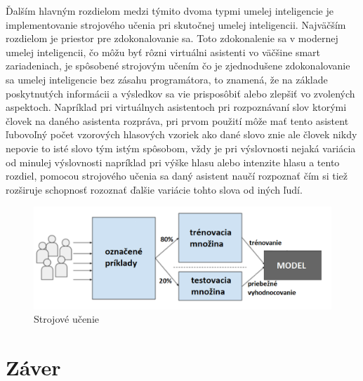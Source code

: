 \documentclass[10pt,oneside,slovak,a4paper]{article}
\begin{document}
Ďalším hlavným rozdielom medzi týmito dvoma typmi umelej inteligencie je implementovanie strojového učenia pri skutočnej umelej inteligencii. Najväčším rozdielom je priestor pre zdokonalovanie sa. Toto zdokonalenie sa v modernej umelej inteligencii, čo môžu byť rôzni virtuálni asistenti vo väčšine smart zariadeniach, je spôsobené strojovým učením čo je zjednodušene zdokonalovanie sa umelej inteligencie bez zásahu programátora, to znamená, že na základe poskytnutých informácii a výsledkov sa vie prisposôbiť alebo zlepšiť vo zvolených aspektoch. Napríklad pri virtuálnych asistentoch pri rozpoznávaní slov ktorými človek na daného asistenta rozpráva, pri prvom použití môže mať tento asistent ľubovoľný počet vzorových hlasových vzoriek ako dané slovo znie ale človek nikdy nepovie to isté slovo tým istým spôsobom, vždy je pri výslovnosti nejaká variácia od minulej výslovnosti napríklad pri výške hlasu alebo intenzite hlasu a tento rozdiel, pomocou strojového učenia sa daný asistent naučí rozpoznať čím si tiež rozširuje schopnosť rozoznať ďalšie variácie tohto slova od iných ľudí.       
\begin{figure}[tbh]
	\centering
	\includegraphics[scale=0.5]{machineLearn.png}
	\caption{Strojové učenie}
	\label{obr7}
\end{figure}

\section{Záver} \label{zaver} %






\end{document}
